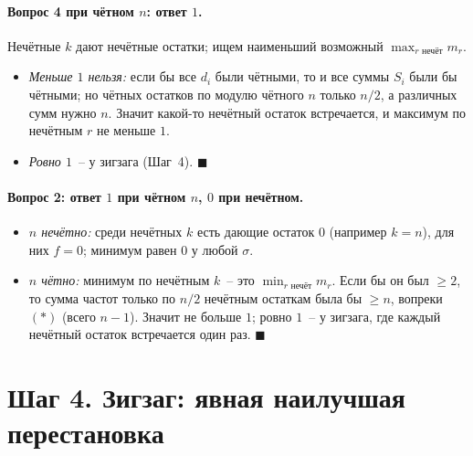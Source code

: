 \documentclass[12pt,a4paper]{article}
\begin{document}
\paragraph{Вопрос 4 при чётном $n$: ответ $1$.} Нечётные $k$ дают нечётные
остатки; ищем наименьший возможный $\max_{r\text{ нечёт}}m_r$.
\begin{itemize}
  \item \emph{Меньше $1$ нельзя:} если бы все $d_i$ были чётными, то и все
        суммы $S_i$ были бы чётными; но чётных остатков по модулю чётного
        $n$ только $n/2$, а различных сумм нужно $n$. Значит какой-то
        нечётный остаток встречается, и максимум по нечётным $r$ не
        меньше $1$.
  \item \emph{Ровно $1$}~-- у зигзага (Шаг~4). \hfill$\blacksquare$
\end{itemize}

\paragraph{Вопрос 2: ответ $1$ при чётном $n$, $0$ при нечётном.}
\begin{itemize}
  \item \emph{$n$ нечётно:} среди нечётных $k$ есть дающие остаток $0$
        (например $k=n$), для них $f=0$; минимум равен $0$ у любой
        $\sigma$.
  \item \emph{$n$ чётно:} минимум по нечётным $k$~-- это
        $\min_{r\text{ нечёт}}m_r$. Если бы он был $\ge2$, то сумма
        частот только по $n/2$ нечётным остаткам была бы $\ge n$,
        вопреки $(\ast)$ (всего $n-1$). Значит не больше $1$; ровно
        $1$~-- у зигзага, где каждый нечётный остаток встречается один
        раз. \hfill$\blacksquare$
\end{itemize}

\section{Шаг 4. Зигзаг: явная наилучшая перестановка}
\end{document}
